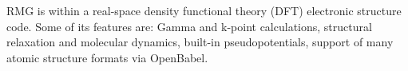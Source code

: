 RMG is within a real-space density functional theory (DFT) electronic structure code. Some of its features are: Gamma and k-point calculations, structural relaxation and molecular dynamics, built-in pseudopotentials, support of many atomic structure formats via OpenBabel.